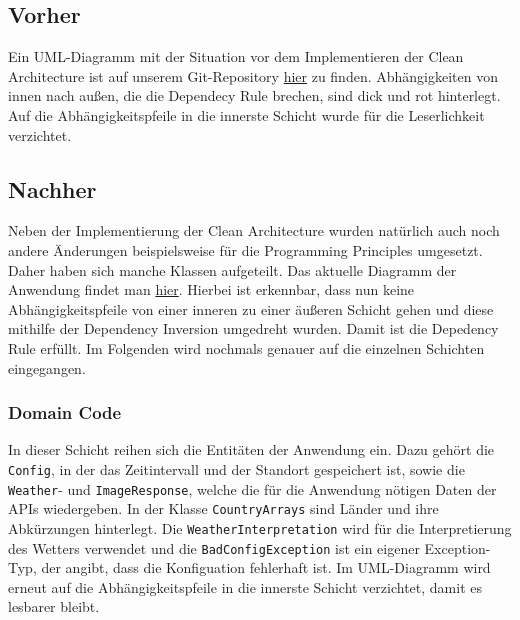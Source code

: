\subsection{Vorher}
Ein UML-Diagramm mit der Situation vor dem Implementieren der Clean Architecture ist auf unserem Git-Repository \href{https://github.com/Bronzila/WeatherWallpaper/blob/master/CleanArchitecturePics/Architektur_Vorher.jpg}{\color{blue}hier} zu finden. Abhängigkeiten von innen nach außen, die die Dependecy Rule brechen, sind dick und rot hinterlegt. Auf die Abhängigkeitspfeile in die innerste Schicht wurde für die Leserlichkeit verzichtet.
\subsection{Nachher}
Neben der Implementierung der Clean Architecture wurden natürlich auch noch andere Änderungen beispielsweise für die Programming Principles umgesetzt. Daher haben sich manche Klassen aufgeteilt. Das aktuelle Diagramm der Anwendung findet man \href{https://github.com/Bronzila/WeatherWallpaper/blob/master/CleanArchitecturePics/Architektur_Vorher.jpg}{\color{blue}hier}. Hierbei ist erkennbar, dass nun keine Abhängigkeitspfeile von einer inneren zu einer äußeren Schicht gehen und diese mithilfe der Dependency Inversion umgedreht wurden. Damit ist die Depedency Rule erfüllt. Im Folgenden wird nochmals genauer auf die einzelnen Schichten eingegangen.
\subsubsection{Domain Code}
In dieser Schicht reihen sich die Entitäten der Anwendung ein. Dazu gehört die \texttt{Config}, in der das Zeitintervall und der Standort gespeichert ist, sowie die \texttt{Weather}- und \texttt{ImageResponse}, welche die für die Anwendung nötigen Daten der APIs wiedergeben. In der Klasse \texttt{CountryArrays} sind Länder und ihre Abkürzungen hinterlegt. Die \texttt{WeatherInterpretation} wird für die Interpretierung des Wetters verwendet und die \texttt{BadConfigException} ist ein eigener Exception-Typ, der angibt, dass die Konfiguation fehlerhaft ist. Im UML-Diagramm wird erneut auf die Abhängigkeitspfeile in die innerste Schicht verzichtet, damit es lesbarer bleibt.
